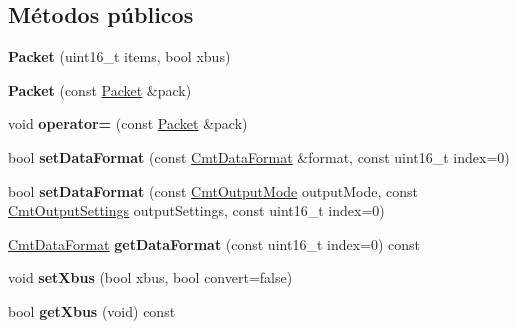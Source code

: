 \subsection*{\-Métodos públicos}
\begin{DoxyCompactItemize}
\item 
\hypertarget{classxsens_1_1Packet_a23ea098c8031e2e2410da4d591b29ab4}{{\bfseries \-Packet} (uint16\-\_\-t items, bool xbus)}\label{classxsens_1_1Packet_a23ea098c8031e2e2410da4d591b29ab4}

\item 
\hypertarget{classxsens_1_1Packet_adf2b5379a68af154cc5f11990ae4d2a4}{{\bfseries \-Packet} (const \hyperlink{classxsens_1_1Packet}{\-Packet} \&pack)}\label{classxsens_1_1Packet_adf2b5379a68af154cc5f11990ae4d2a4}

\item 
\hypertarget{classxsens_1_1Packet_a8fc1c519de40b615721ee54adfdb18a4}{void {\bfseries operator=} (const \hyperlink{classxsens_1_1Packet}{\-Packet} \&pack)}\label{classxsens_1_1Packet_a8fc1c519de40b615721ee54adfdb18a4}

\item 
\hypertarget{classxsens_1_1Packet_a902f7be5c84836470496d2b1c266f1ac}{bool {\bfseries set\-Data\-Format} (const \hyperlink{structCmtDataFormat}{\-Cmt\-Data\-Format} \&format, const uint16\-\_\-t index=0)}\label{classxsens_1_1Packet_a902f7be5c84836470496d2b1c266f1ac}

\item 
\hypertarget{classxsens_1_1Packet_a4f26cea6817e035f2a125fc153649618}{bool {\bfseries set\-Data\-Format} (const \hyperlink{cmtdef_8h_a85df1cdea0bf11e38292e3cd5d69e747}{\-Cmt\-Output\-Mode} output\-Mode, const \hyperlink{cmtdef_8h_a4125efede0d0948ee49291165a1d089b}{\-Cmt\-Output\-Settings} output\-Settings, const uint16\-\_\-t index=0)}\label{classxsens_1_1Packet_a4f26cea6817e035f2a125fc153649618}

\item 
\hypertarget{classxsens_1_1Packet_a1a3d2e380837504d43dd09487f4a93af}{\hyperlink{structCmtDataFormat}{\-Cmt\-Data\-Format} {\bfseries get\-Data\-Format} (const uint16\-\_\-t index=0) const }\label{classxsens_1_1Packet_a1a3d2e380837504d43dd09487f4a93af}

\item 
\hypertarget{classxsens_1_1Packet_a17a3380458faf096414c0971cc596216}{void {\bfseries set\-Xbus} (bool xbus, bool convert=false)}\label{classxsens_1_1Packet_a17a3380458faf096414c0971cc596216}

\item 
\hypertarget{classxsens_1_1Packet_a5c8d1e04c31aba59ddc2a2491f0ae526}{bool {\bfseries get\-Xbus} (void) const }\label{classxsens_1_1Packet_a5c8d1e04c31aba59ddc2a2491f0ae526}


\end{DoxyCompactItemize}
